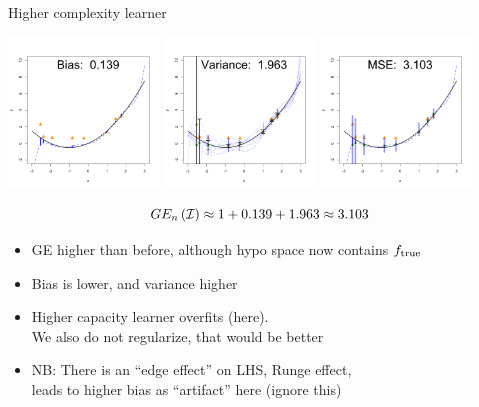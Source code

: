 \documentclass[11pt,compress,t,notes=noshow, xcolor=table]{beamer}
\begin{document}
\begin{vbframe}{Higher complexity learner}

\begin{center}
  \includegraphics[width = 0.3\textwidth]{figure/bias_variance_decomposition-complex_model_bias.png}
  \includegraphics[width = 0.3\textwidth]{figure/bias_variance_decomposition-complex_model_variance.png}
  \includegraphics[width = 0.3\textwidth]{figure/bias_variance_decomposition-complex_model_mse.png}
\end{center}


$$GE_n\left(\mathcal{I}\right) \approx 1 + 0.139 + 1.963 \approx 3.103 $$

\vfill


\begin{itemize}
\item GE higher than before, although hypo space now contains $f_{\text{true}}$
\item Bias is lower, and variance higher 
\item Higher capacity learner overfits (here).\\
   We also do not regularize, that would be better
   
\item NB: There is an ``edge effect'' on LHS, Runge effect,\\
  leads to higher bias as ``artifact'' here (ignore this)
\end{itemize}


\end{vbframe}
\end{document}
